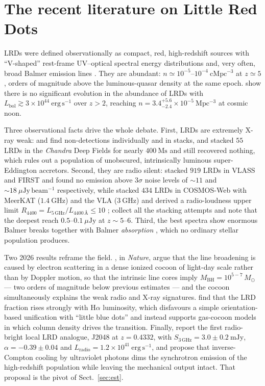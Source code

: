 \documentclass[11pt,a4paper]{article}
\newcommand{\ergs}{\ \mathrm{erg\,s^{-1}}}
\begin{document}
\section{The recent literature on Little Red Dots}
\label{sec:lit}
LRDs were defined observationally as compact, red, high-redshift sources with
``V-shaped'' rest-frame UV--optical spectral energy distributions and, very
often, broad Balmer emission lines
\citep{Matthee2024,Labbe2025,Greene2024,Kocevski2025}. They are abundant:
$n\simeq10^{-5}$--$10^{-4}\ \mathrm{cMpc^{-3}}$ at $z\simeq5$
\citep{Matthee2024,Akins2025}, orders of magnitude above the luminous-quasar
density at the same epoch. \citet{Loiacono2026} show there is no significant
evolution in the abundance of LRDs with
$L_{\mathrm{bol}}\gtrsim3\times10^{44}\ergs$ over $z>2$, reaching
$n = 3.4^{+5.6}_{-2.4}\times10^{-5}\ \mathrm{Mpc^{-3}}$ at cosmic noon.

Three observational facts drive the whole debate. First, LRDs are extremely
X-ray weak: \citet{Ananna2024} and \citet{Tortosa2026} find non-detections
individually and in stacks, and \citet{Sacchi2025} stacked $55$ LRDs in the
\emph{Chandra} Deep Fields for nearly $400\ \mathrm{Ms}$ and still recovered
nothing, which rules out a population of unobscured, intrinsically luminous
super-Eddington accretors. Second, they are radio silent:
\citet{Perger2025} stacked $919$ LRDs in VLASS and FIRST and found no emission
above $3\sigma$ noise levels of $\sim\!11$ and $\sim\!18\ \mu\mathrm{Jy\,
beam^{-1}}$ respectively, while \citet{Akins2025} stacked $434$ LRDs in
COSMOS-Web with MeerKAT ($1.4\ \mathrm{GHz}$) and the VLA ($3\ \mathrm{GHz}$)
and derived a radio-loudness upper limit $R_{4400}=L_{5\,\mathrm{GHz}}/
L_{4400\,\text{\AA}}\le10$ \citep[in the sense of][]{Kellermann1989};
\citet{Mazzolari2026} collect all the stacking attempts and note that the
deepest reach $0.5$--$0.1\ \mu\mathrm{Jy}$ at $z\sim5$--$6$. Third, the best
spectra show enormous Balmer breaks together with Balmer \emph{absorption}
\citep{Naidu2025,Rusakov2026}, which no ordinary stellar population produces.

Two 2026 results reframe the field. \citet{Rusakov2026}, in \emph{Nature},
argue that the line broadening is caused by electron scattering in a dense
ionized cocoon of light-day scale rather than by Doppler motion, so that the
intrinsic line cores imply $M_{\mathrm{BH}}=10^{5-7}\,M_\odot$ --- two orders of
magnitude below previous estimates --- and the cocoon simultaneously explains
the weak radio and X-ray signatures. \citet{Barrufet2026} find that the LRD
fraction rises strongly with H$\alpha$ luminosity, which disfavours a simple
orientation-based unification with ``little blue dots'' and instead supports
gas-cocoon models in which column density drives the transition. Finally,
\citet{Rodriguez2026} report the first radio-bright local LRD analogue, J2048 at
$z=0.4332$, with $S_{3\,\mathrm{GHz}}=3.0\pm0.2\ \mathrm{mJy}$,
$\alpha=-0.39\pm0.04$ and $L_{\mathrm{radio}}=1.2\times10^{41}\ergs$, and
propose that inverse-Compton cooling by ultraviolet photons dims the synchrotron
emission of the high-redshift population while leaving the mechanical output
intact. That proposal is the pivot of Sect.~\ref{sec:est}.
\end{document}
